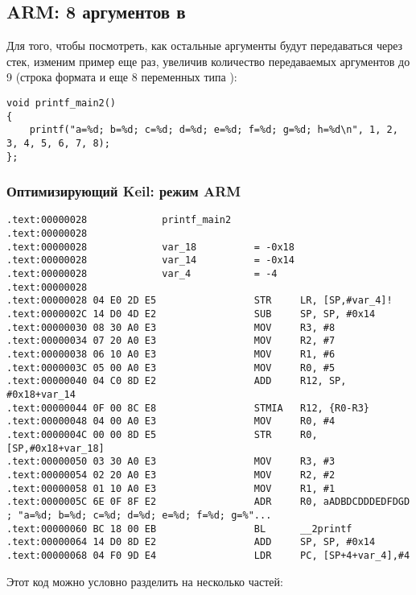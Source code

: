 ﻿%
\subsection{ARM: 8 аргументов в \printf}

Для того, чтобы посмотреть, как остальные аргументы будут передаваться через стек, изменим пример еще раз, 
увеличив количество передаваемых аргументов до 9 (строка формата \printf и еще 8 переменных типа \Tint):

\begin{lstlisting}
void printf_main2()
{
	printf("a=%d; b=%d; c=%d; d=%d; e=%d; f=%d; g=%d; h=%d\n", 1, 2, 3, 4, 5, 6, 7, 8);
};
\end{lstlisting}

\subsubsection{Оптимизирующий Keil: режим ARM}

\begin{lstlisting}
.text:00000028             printf_main2
.text:00000028
.text:00000028             var_18          = -0x18
.text:00000028             var_14          = -0x14
.text:00000028             var_4           = -4
.text:00000028
.text:00000028 04 E0 2D E5                 STR     LR, [SP,#var_4]!
.text:0000002C 14 D0 4D E2                 SUB     SP, SP, #0x14
.text:00000030 08 30 A0 E3                 MOV     R3, #8
.text:00000034 07 20 A0 E3                 MOV     R2, #7
.text:00000038 06 10 A0 E3                 MOV     R1, #6
.text:0000003C 05 00 A0 E3                 MOV     R0, #5
.text:00000040 04 C0 8D E2                 ADD     R12, SP, #0x18+var_14
.text:00000044 0F 00 8C E8                 STMIA   R12, {R0-R3}
.text:00000048 04 00 A0 E3                 MOV     R0, #4
.text:0000004C 00 00 8D E5                 STR     R0, [SP,#0x18+var_18]
.text:00000050 03 30 A0 E3                 MOV     R3, #3
.text:00000054 02 20 A0 E3                 MOV     R2, #2
.text:00000058 01 10 A0 E3                 MOV     R1, #1
.text:0000005C 6E 0F 8F E2                 ADR     R0, aADBDCDDDEDFDGD ; "a=%d; b=%d; c=%d; d=%d; e=%d; f=%d; g=%"...
.text:00000060 BC 18 00 EB                 BL      __2printf
.text:00000064 14 D0 8D E2                 ADD     SP, SP, #0x14
.text:00000068 04 F0 9D E4                 LDR     PC, [SP+4+var_4],#4
\end{lstlisting}

Этот код можно условно разделить на несколько частей:

